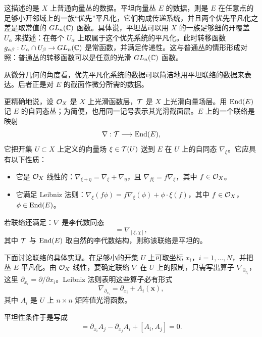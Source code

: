 这描述的是 $X$ 上普通向量丛的数据。平坦向量丛 $E$ 的数据，则是 $E$ 在任意点的足够小开邻域上的一族“优先”平凡化，它们构成传递系统，并且两个优先平凡化之差是取常值的 $GL_n(\mathbb{C})$ 函数。具体说，平坦丛可以用 $X$ 的一族足够细的开覆盖 $U_\alpha$ 来描述：在每个 $U_\alpha$ 上取属于这个优先系统的平凡化。此时转移函数 $g_{\alpha\beta}:U_\alpha\cap U_\beta\to GL_n(\mathbb{C})$ 是常函数，并满足传递性。这与普通丛的情形形成对照：普通丛的转移函数可以是任意的光滑 $GL_n(\mathbb{C})$ 函数。

从微分几何的角度看，优先平凡化系统的数据可以简洁地用平坦联络的数据来表达。后者正是对 $E$ 的截面作微分所需的数据。

更精确地说，设 $\mathcal{O}_X$ 是 $X$ 上光滑函数层，$\mathcal{T}$ 是 $X$ 上光滑向量场层。用 $\operatorname{End}(E)$ 记 $E$ 的自同态丛；为简便，也用同一记号表示其光滑截面层。$E$ 上的一个联络是映射
\[
    \nabla:\mathcal{T}\longrightarrow\operatorname{End}(E),
\]
它把开集 $U\subset X$ 上定义的向量场 $\xi\in\mathcal{T}(U)$ 送到 $E$ 在 $U$ 上的自同态 $\nabla_\xi$。它应具有以下性质：
\begin{itemize}
    \item 它是 $\mathcal{O}_X$ 线性的：$\nabla_{\xi+\eta}=\nabla_\xi+\nabla_\eta$，且 $\nabla_{f\xi}=f\nabla_\xi$，其中 $f\in\mathcal{O}_X$。
    \item 它满足 Leibniz 法则：$\nabla_\xi(f\phi)=f\nabla_\xi(\phi)+\phi\cdot\xi(f)$，其中 $f\in\mathcal{O}_X$，$\phi\in\operatorname{End}(E)$。
\end{itemize}

若联络还满足：$\nabla$ 是李代数同态
\begin{equation}
    [\nabla_\xi,\nabla_\chi]=\nabla_{[\xi,\chi]},
    \tag{1.2-1}
\end{equation}
其中 $\mathcal{T}$ 与 $\operatorname{End}(E)$ 取自然的李代数结构，则称该联络是平坦的。

下面讨论联络的具体实现。在足够小的开集 $U$ 上可取坐标 $x_i$，$i=1,\dots,N$，并把丛 $E$ 平凡化。由 $\mathcal{O}_X$ 线性，要确定联络 $\nabla$ 在 $U$ 上的限制，只需写出算子 $\nabla_{\partial_{x_i}}$，这里 $\partial_{x_i}=\partial/\partial x_i$。Leibniz 法则表明这些算子必有形式
\[
    \nabla_{\partial_{x_i}}=\partial_{x_i}+A_i(\mathbf{x}),
\]
其中 $A_i$ 是 $U$ 上 $n\times n$ 矩阵值光滑函数。

平坦性条件于是写成
\begin{equation}
    [\nabla_{\partial_{x_i}},\nabla_{\partial_{x_j}}]
    =\partial_{x_i}A_j-\partial_{x_j}A_i+[A_i,A_j]=0.
    \tag{1.2-2}
\end{equation}

